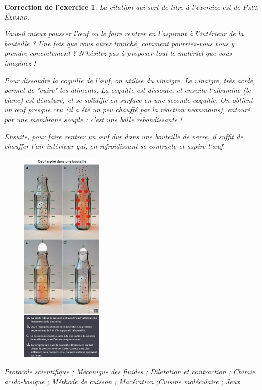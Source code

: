 \documentclass[12pt]{article}
\theoremstyle{break}
\newtheorem{cor}{Correction de l'exercice}
\begin{document}
\begin{cor}
\textit{La citation qui sert de titre à l'exercice est de \textsc{Paul Éluard}.} \newline

\textit{Vaut-il mieux pousser l’œuf ou le faire rentrer en l'aspirant à l'intérieur de la bouteille ? Une fois que vous aurez tranché, comment pourriez-vous vous y prendre concrètement ? N'hésitez pas à proposer tout le matériel que vous imaginez !}

Pour dissoudre la coquille de l’œuf, on utilise du vinaigre. Le vinaigre, très acide, permet de "cuire" les aliments. La coquille est dissoute, et ensuite l'albumine (le blanc) est dénaturé, et se solidifie en surface en une seconde coquille. On obtient un œuf presque cru (il a été un peu chauffé par la réaction néanmoins), entouré par une membrane souple : c'est une balle rebondissante !

Ensuite, pour faire rentrer un œuf dur dans une bouteille de verre, il suffit de chauffer l'air intérieur qui, en refroidissant se contracte et aspire l’œuf.\newline 

\begin{figure}[!ht]
	\centering
    \includegraphics[width=0.35\textwidth]{images/ExplicationOeuf.jpg}
    
\end{figure}

 \textit{Protocole scientifique ; Mécanique des fluides ; Dilatation et contraction ; Chimie acido-basique ; Méthode de cuisson ; Macération ;Cuisine moléculaire ; Jeux}
\end{cor}
\end{document}
